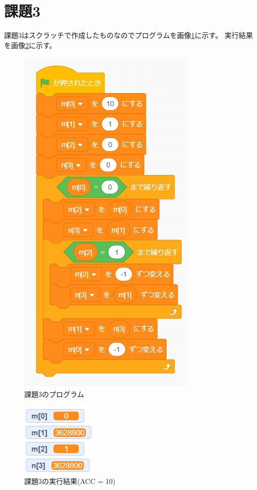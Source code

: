 \documentclass[a4paper,11pt]{ltjsarticle}
\begin{document}
\section{課題3}
課題3はスクラッチで作成したものなのでプログラムを画像\ref{fig:kadai3}に示す。
実行結果を画像\ref{fig:kadai3res}に示す。
\begin{figure}[htbp]
  \centering
  \includegraphics{./image/kadai3.png}
  \caption{課題3のプログラム}
  \label{fig:kadai3}
\end{figure}
\begin{figure}[htbp]
  \centering
  \includegraphics{./image/kadai3res.png}
  \caption{課題3の実行結果(ACC = 10)}
  \label{fig:kadai3res}
\end{figure}
\end{document}
